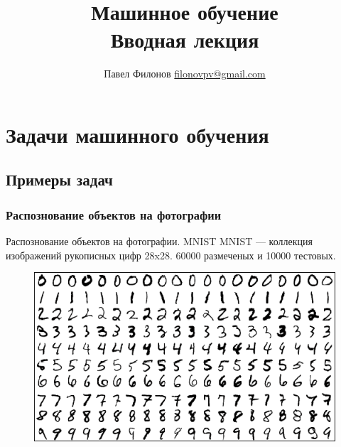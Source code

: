 \documentclass{beamer}
\title{Машинное обучение \\ Вводная лекция}
\author{Павел Филонов \href{mailto:filonovpv@gmail.com}{filonovpv@gmail.com}}
\begin{document}
\begin{frame}
    \titlepage
\end{frame}


\section{Задачи машинного обучения}

\subsection{Примеры задач}
\subsubsection{Распознование объектов на фотографии}
\begin{frame}{Распознование объектов на фотографии. MNIST}
    MNIST --- коллекция изображений рукописных цифр 28x28. 60000 размеченых и 10000 тестовых.
    \begin{figure}
        \includegraphics[width=\linewidth]{fig/mnist.png}
    \end{figure}
\end{frame}
\end{document}
